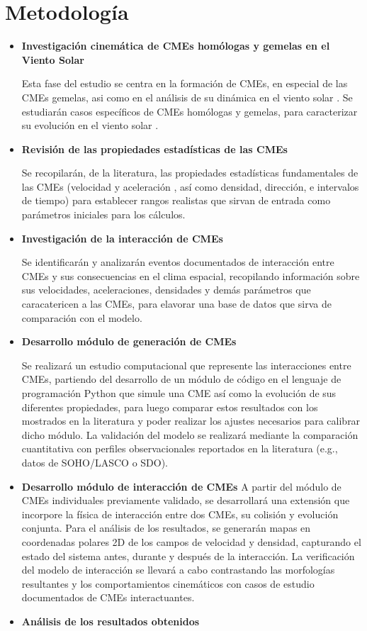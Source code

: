 \section{Metodología}
\begin{itemize}
\item \textbf{Investigación cinemática de CMEs homólogas y gemelas en el Viento Solar}

Esta fase del estudio se centra en la formación de CMEs, en especial de las CMEs gemelas, asi como en el análisis de su dinámica en el viento solar \parencite[e.g.,][]{manchester-2017}. Se estudiarán casos específicos de CMEs homólogas y gemelas, para caracterizar su evolución en el viento solar \parencite[e.g.,][]{gallagher-2003, zhang-2006, chen-2003}.
\item \textbf{Revisión de las propiedades estadísticas de las CMEs}

Se recopilarán, de la literatura, las propiedades estadísticas fundamentales de las CMEs (velocidad y aceleración \textcite[e.g.,][]{zhang-2006}, así como densidad, dirección, e intervalos de tiempo) para establecer rangos realistas que sirvan de entrada como parámetros iniciales para los cálculos.
\item \textbf{Investigación de la interacción de CMEs}

Se identificarán y analizarán eventos documentados de interacción entre CMEs y sus consecuencias en el clima espacial, recopilando información sobre sus velocidades, aceleraciones, densidades y demás parámetros que caracatericen a las CMEs, para elavorar una base de datos que sirva de comparación con el modelo.
\item \textbf{Desarrollo módulo de generación de CMEs}

Se realizará un estudio computacional que represente las interacciones entre CMEs, partiendo del desarrollo de un módulo de código en el lenguaje de programación Python que simule una CME así como la evolución de sus diferentes propiedades, para luego comparar estos resultados con los mostrados en la literatura y poder realizar los ajustes necesarios para calibrar dicho módulo. La validación del modelo se realizará mediante la comparación cuantitativa con perfiles observacionales reportados en la literatura (e.g., datos de SOHO/LASCO o SDO).

\item \textbf{Desarrollo módulo de interacción de CMEs}
A partir del módulo de CMEs individuales previamente validado, se desarrollará una extensión que incorpore la física de interacción entre dos CMEs, su colisión y evolución conjunta. Para el análisis de los resultados, se generarán mapas en coordenadas polares 2D de los campos de velocidad y densidad, capturando el estado del sistema antes, durante y después de la interacción. La verificación del modelo de interacción se llevará a cabo contrastando las morfologías resultantes y los comportamientos cinemáticos con casos de estudio documentados de CMEs interactuantes. 
\newpage
\item \textbf{Análisis de los resultados obtenidos}


\end{itemize}
